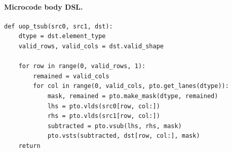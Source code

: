 \paragraph{Microcode body DSL.}
\begin{lstlisting}[style=ptocode]
def uop_tsub(src0, src1, dst):
    dtype = dst.element_type
    valid_rows, valid_cols = dst.valid_shape

    for row in range(0, valid_rows, 1):
        remained = valid_cols
        for col in range(0, valid_cols, pto.get_lanes(dtype)):
            mask, remained = pto.make_mask(dtype, remained)
            lhs = pto.vlds(src0[row, col:])
            rhs = pto.vlds(src1[row, col:])
            subtracted = pto.vsub(lhs, rhs, mask)
            pto.vsts(subtracted, dst[row, col:], mask)
    return
\end{lstlisting}
\Needspace{0.34\textheight}
